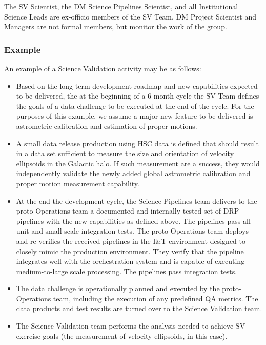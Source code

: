 The SV Scientist, the DM Science Pipelines Scientist, and all Institutional
Science Leads are ex-officio members of the SV Team.  DM Project Scientist and
Managers are not formal members, but monitor the work of the group.

\subsubsection{Example}

An example of a Science Validation activity may be as follows:

\begin{itemize}

\item Based on the long-term development roadmap and new capabilities
expected to be delivered, the at the beginning of a 6-month cycle the SV
Team defines the goals of a data challenge to be executed at the end of the
cycle.  For the purposes of this example, we assume a major new feature to
be delivered is astrometric calibration and estimation of proper motions.

\item A small data release production using HSC data is defined that
should result in a data set sufficient to measure the size and orientation
of velocity ellipsoids in the Galactic halo.  If such measurement are a
success, they would independently validate the newly added global
astrometric calibration and proper motion measurement capability.

\item At the end the development cycle, the Science Pipelines team delivers to the
proto-Operations team a documented and internally tested set of DRP
pipelines with the new capabilities as defined above.  The pipelines pass
all unit and small-scale integration tests.  The proto-Operations team
deploys and re-verifies the received pipelines in the I\&T environment
designed to closely mimic the production environment.  They verify that the
pipeline integrates well with the orchestration system and is capable of
executing medium-to-large scale processing.  The pipelines pass integration
tests.

\item The data challenge is operationally planned and executed by the
proto-Operations team, including the execution of any predefined QA metrics.
The data products and test results are turned over to the Science
Validation team.

\item The Science Validation team performs the analysis needed to achieve
SV exercise goals (the measurement of velocity ellipsoids, in this case).


\end{itemize}
